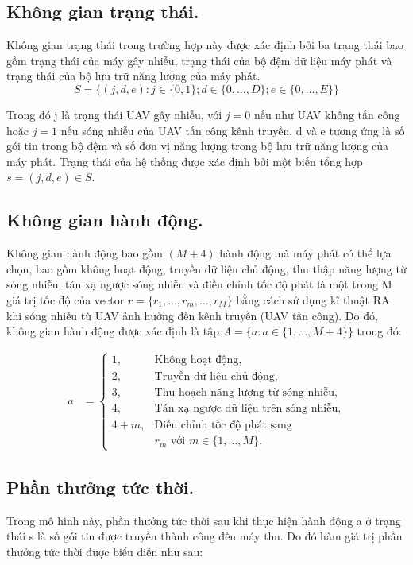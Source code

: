 \documentclass{uetgraduation}
\begin{document}
\subsection{Không gian trạng thái.}
Không gian trạng thái trong trường hợp này được xác định bởi ba trạng thái bao gồm trạng thái của máy gây nhiễu, trạng thái của bộ đệm dữ liệu máy phát và trạng thái của bộ lưu
trữ năng lượng của máy phát.
\[
S = \{(j, d, e) : j \in \{0, 1\}; d \in \{0, \dots, D\}; e \in \{0, \dots, E\}\}
\]

Trong đó j là trạng thái UAV gây nhiễu, với $j = 0$ nếu như UAV không tấn công hoặc $j = 1$ nếu sóng nhiễu của UAV tấn công kênh truyền, d và e tương ứng là số gói tin trong bộ
đệm và số đơn vị năng lượng trong bộ lưu trữ năng lượng của máy phát. Trạng thái của hệ thống được xác định bởi một biến tổng hợp $s = (j, d, e) \in S$.

\subsection{Không gian hành động.}
Không gian hành động bao gồm $(M+4)$ hành động mà máy phát có thể lựa chọn, bao gồm không hoạt động, truyền dữ liệu chủ động, thu thập năng lượng từ sóng nhiễu, tán xạ ngược sóng
nhiễu và điều chỉnh tốc độ phát là một trong M giá trị tốc độ của vector $r = \{r_1, \dots, r_m,\dots, r_M\}$ bằng cách sử dụng kĩ thuật RA khi sóng nhiễu từ UAV ảnh hưởng đến
kênh truyền (UAV tấn công). Do đó, không gian hành động được xác định là tập $A = \{a : a \in \{1, \dots, M+4\}\}$ trong đó:

\begin{align*}
    a &= \begin{cases}
        1, & \text{Không hoạt động,} \\
        2, & \text{Truyền dữ liệu chủ động,} \\
        3, & \text{Thu hoạch năng lượng từ sóng nhiễu,} \\
        4, & \text{Tán xạ ngược dữ liệu trên sóng nhiễu,} \\
        4 + m, & \text{Điều chỉnh tốc độ phát sang } \\
                & r_m \text{ với } m \in \{1, \ldots, M\}.
    \end{cases}
\end{align*}

\subsection{Phần thưởng tức thời.}
Trong mô hình này, phần thưởng tức thời sau khi thực hiện hành động a ở trạng thái s là số gói tin được truyền thành công đến máy thu. Do đó hàm giá
trị phần thưởng tức thời được biểu diễn như sau:
\end{document}
